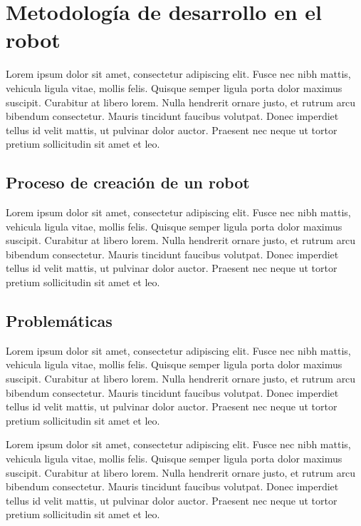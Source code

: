 \chapter{Metodología de desarrollo en el robot}\label{ch:chapter3}

Lorem ipsum dolor sit amet, consectetur adipiscing elit. Fusce nec nibh mattis, vehicula ligula vitae, mollis felis. Quisque semper ligula porta dolor maximus suscipit. Curabitur at libero lorem. Nulla hendrerit ornare justo, et rutrum arcu bibendum consectetur. Mauris tincidunt faucibus volutpat. Donec imperdiet tellus id velit mattis, ut pulvinar dolor auctor. Praesent nec neque ut tortor pretium sollicitudin sit amet et leo.

\section{Proceso de creación de un robot}

Lorem ipsum dolor sit amet, consectetur adipiscing elit. Fusce nec nibh mattis, vehicula ligula vitae, mollis felis. Quisque semper ligula porta dolor maximus suscipit. Curabitur at libero lorem. Nulla hendrerit ornare justo, et rutrum arcu bibendum consectetur. Mauris tincidunt faucibus volutpat. Donec imperdiet tellus id velit mattis, ut pulvinar dolor auctor. Praesent nec neque ut tortor pretium sollicitudin sit amet et leo.

\section{Problemáticas}

Lorem ipsum dolor sit amet, consectetur adipiscing elit. Fusce nec nibh mattis, vehicula ligula vitae, mollis felis. Quisque semper ligula porta dolor maximus suscipit. Curabitur at libero lorem. Nulla hendrerit ornare justo, et rutrum arcu bibendum consectetur. Mauris tincidunt faucibus volutpat. Donec imperdiet tellus id velit mattis, ut pulvinar dolor auctor. Praesent nec neque ut tortor pretium sollicitudin sit amet et leo.


Lorem ipsum dolor sit amet, consectetur adipiscing elit. Fusce nec nibh mattis, vehicula ligula vitae, mollis felis. Quisque semper ligula porta dolor maximus suscipit. Curabitur at libero lorem. Nulla hendrerit ornare justo, et rutrum arcu bibendum consectetur. Mauris tincidunt faucibus volutpat. Donec imperdiet tellus id velit mattis, ut pulvinar dolor auctor. Praesent nec neque ut tortor pretium sollicitudin sit amet et leo.

